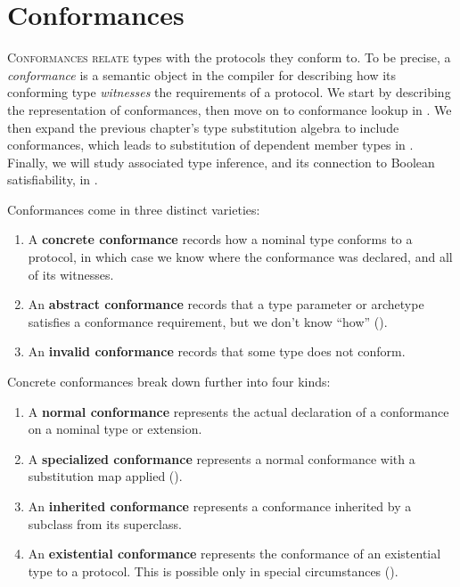 \documentclass[../generics]{subfiles}
\begin{document}
\chapter{Conformances}\label{chap:conformances}

\lettrine{C}{onformances relate} types with the protocols they conform to. To be precise, a \emph{conformance} is a semantic object in the compiler for describing how its conforming type \emph{witnesses} the requirements of a protocol. We start by describing the representation of conformances, then move on to conformance lookup in . We then expand the previous chapter's type substitution algebra to include conformances, which leads to substitution of dependent member types in . Finally, we will study associated type inference, and its connection to Boolean satisfiability, in .

Conformances come in three distinct varieties:
\begin{enumerate}
\item A \textbf{concrete conformance} records how a nominal type conforms to a protocol, in which case we know where the conformance was declared, and all of its witnesses.
\item An \textbf{abstract conformance} records that a type parameter or archetype satisfies a conformance requirement, but we don't know ``how'' ().
\item An \textbf{invalid conformance} records that some type does not conform.
\end{enumerate}
Concrete conformances break down further into four kinds:
\begin{enumerate}
\item A \textbf{normal conformance} represents the actual declaration of a conformance on a nominal type or extension.
\item A \textbf{specialized conformance} represents a normal conformance with a substitution map applied ().
\item An \textbf{inherited conformance} represents a conformance inherited by a subclass from its superclass.
\item An \textbf{existential conformance} represents the conformance of an existential type to a protocol. This is possible only in special circumstances ().
\end{enumerate}
\end{document}
